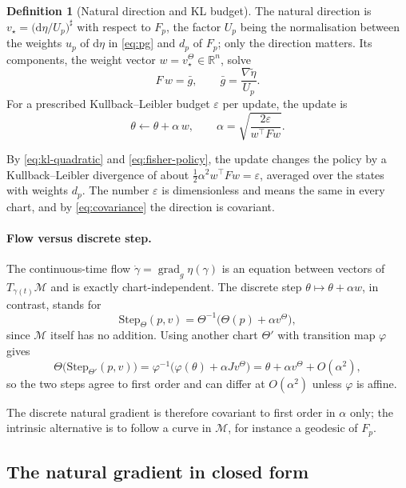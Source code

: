 \documentclass[11pt,a4paper]{article}
\numberwithin{equation}{section}
\theoremstyle{plain}
\theoremstyle{definition}
\newtheorem{definition}[theorem]{Definition}
\theoremstyle{remark}
\newcommand{\R}{\mathbb{R}}
\newcommand{\T}{^{\top}}
\newcommand{\dd}{\mathrm{d}}
\DeclareMathOperator{\grad}{grad}
\newcommand{\mani}{\mathcal{M}}
\begin{document}
\begin{definition}[Natural direction and KL budget]\label{def:natural}
The natural direction is $v_\star=\bigl(\dd\eta/U_p\bigr)^\sharp$ with respect to $F_p$, the factor $U_p$ being the normalisation between the weights $u_p$ of $\dd\eta$ in \eqref{eq:pg} and
$d_p$ of $F_p$; only the direction matters. Its components, the weight vector $w=v_\star^\Theta\in\R^n$, solve
\begin{equation}\label{eq:natural-eq}
  F\,w=\bar g,\qquad\bar g=\frac{\nabla\tilde\eta}{U_p}.
\end{equation}
For a prescribed Kullback--Leibler budget $\varepsilon$ per update, the update is
\begin{equation}\label{eq:budget}
  \theta\leftarrow\theta+\alpha\,w,\qquad\alpha=\sqrt{\frac{2\varepsilon}{w\T Fw}} .
\end{equation}
\end{definition}

By \eqref{eq:kl-quadratic} and \eqref{eq:fisher-policy}, the update changes the policy by a Kullback--Leibler divergence of about $\tfrac12\alpha^2w\T Fw=\varepsilon$, averaged over the states with weights
$d_p$. The number $\varepsilon$ is dimensionless and means the same in every chart, and by \eqref{eq:covariance} the direction is covariant.

\paragraph{Flow versus discrete step.}
The continuous-time flow $\dot\gamma=\grad_g\eta(\gamma)$ is an equation between vectors of $T_{\gamma(t)}\mani$ and is exactly chart-independent. The discrete step $\theta\mapsto\theta+\alpha w$, in contrast, stands for
\[
  \mathrm{Step}_\Theta(p,v)=\Theta^{-1}\bigl(\Theta(p)+\alpha v^\Theta\bigr),
\]
since $\mani$ itself has no addition. Using another chart $\Theta'$ with transition map $\varphi$ gives
\[
  \Theta\bigl(\mathrm{Step}_{\Theta'}(p,v)\bigr)=\varphi^{-1}\bigl(\varphi(\theta)+\alpha J v^\Theta\bigr)=\theta+\alpha v^\Theta+O(\alpha^2),
\]
so the two steps agree to first order and can differ at $O(\alpha^2)$ unless $\varphi$ is affine.

The discrete natural gradient is therefore covariant to first order in $\alpha$ only; the intrinsic alternative is to follow a curve in $\mani$, for instance a geodesic of $F_p$.

\subsection{The natural gradient in closed form}
\end{document}
